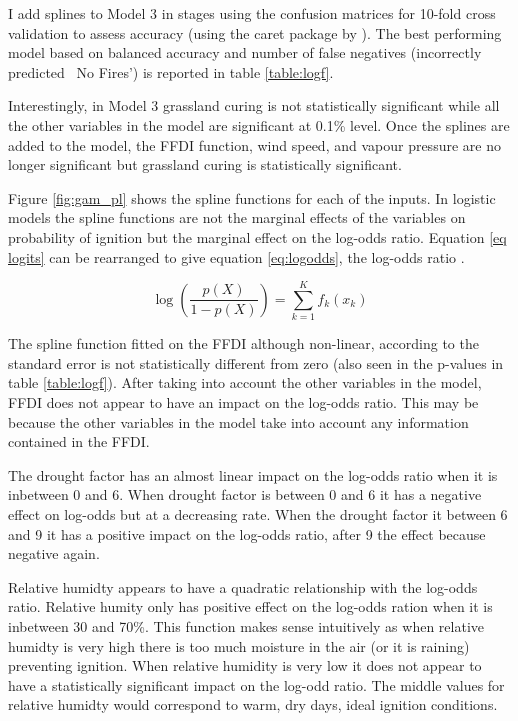 \documentclass{article}
\begin{document}
I add splines to Model 3 in stages using the confusion matrices for 10-fold cross validation to assess accuracy (using the caret package by \cite{caret}). The best performing model based on balanced accuracy and number of false negatives (incorrectly predicted ~No Fires') is reported in table \ref{table:logf}. 

Interestingly, in Model 3 grassland curing is not statistically significant while all the other variables in the model are significant at 0.1\% level. Once the splines are added to the model, the FFDI function, wind speed, and vapour pressure are no longer significant but grassland curing is statistically significant. 

Figure \ref{fig:gam_pl} shows the spline functions for each of the inputs. In logistic models the spline functions are not the marginal effects of the variables on probability of ignition but the marginal effect on the log-odds ratio. Equation \ref{eq logits} can be rearranged to give equation \ref{eq:logodds}, the log-odds ratio \citep{james13}. 

\begin{equation}
\label{eq:logodds}
\log(\frac{p(X)}{1-p(X)}) = \sum_{k=1}^{K} f_k (x_k)
\end{equation}

The spline function fitted on the FFDI although non-linear, according to the standard error is not statistically different from zero (also seen in the p-values in table \ref{table:logf}). After taking into account the other variables in the model, FFDI does not appear to have an impact on the log-odds ratio. This may be because the other variables in the model take into account any information contained in the FFDI. 

The drought factor has an almost linear impact on the log-odds ratio when it is inbetween 0 and 6. When drought factor is between 0 and 6 it has a negative effect on log-odds but at a decreasing rate. When the drought factor it between 6 and 9 it has a positive impact on the log-odds ratio, after 9 the effect because negative again. 

Relative humidty appears to have a quadratic relationship with the log-odds ratio. Relative humity only has positive effect on the log-odds ration when it is inbetween 30 and 70\%. This function makes sense intuitively as when relative humidty is very high there is too much moisture in the air (or it is raining) preventing ignition. When relative humidity is very low it does not appear to have a statistically significant impact on the log-odd ratio. The middle values for relative humidty would correspond to warm, dry days, ideal ignition conditions. 
\end{document}
